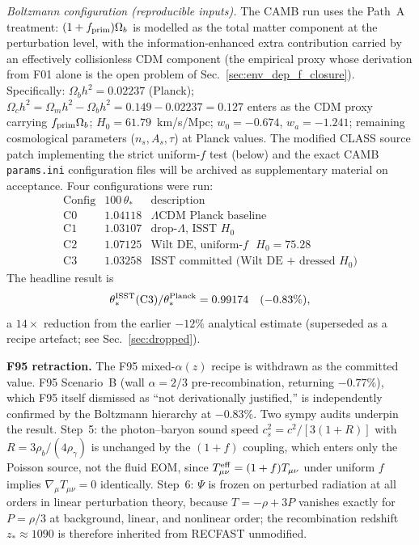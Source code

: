 \documentclass[aps,prd,twocolumn,nofootinbib,floatfix,superscriptaddress]{revtex4-2}
\newcommand{\fprim}{f_{\rm prim}}
\begin{document}
\emph{Boltzmann configuration (reproducible inputs).} The CAMB run
uses the Path~A treatment: $(1+\fprim)\Omega_b$ is modelled as the
total matter component at the perturbation level, with the
information-enhanced extra contribution carried by an effectively
collisionless CDM component (the empirical proxy whose derivation
from F01 alone is the open problem of
Sec.~\ref{sec:env_dep_f_closure}). Specifically: $\Omega_b h^2
= 0.02237$ (Planck); $\Omega_c h^2 = \Omega_m h^2 - \Omega_b h^2
= 0.149 - 0.02237 = 0.127$ enters as the CDM proxy carrying
$\fprim\Omega_b$; $H_0 = 61.79$~km/s/Mpc; $w_0 = -0.674$,
$w_a = -1.241$; remaining cosmological parameters
($n_s, A_s, \tau$) at Planck values. The modified CLASS source
patch implementing the strict uniform-$f$ test (below) and the
exact CAMB \texttt{params.ini} configuration files will be
archived as supplementary material on acceptance. Four
configurations were run:
\begin{equation*}
\begin{array}{lcl}
\textrm{Config} & 100\,\theta_* & \textrm{description} \\
\hline
\textrm{C0} & 1.04118 & \textrm{$\Lambda$CDM Planck baseline} \\
\textrm{C1} & 1.03107 & \textrm{drop-$\Lambda$, ISST $H_0$} \\
\textrm{C2} & 1.07125 & \textrm{Wilt DE, uniform-$f$ $H_0=75.28$} \\
\textrm{C3} & 1.03258 & \textrm{ISST committed (Wilt DE + dressed $H_0$)}
\end{array}
\end{equation*}
The headline result is
\begin{equation}
\theta_*^{\rm ISST}({\rm C3})/\theta_*^{\rm Planck} = 0.99174
\quad (-0.83\%),
\end{equation}
a $14\times$ reduction from the earlier $-12\%$ analytical estimate
(superseded as a recipe artefact; see Sec.~\ref{sec:dropped}).

\textbf{F95 retraction.} The F95 mixed-$\alpha(z)$ recipe is
withdrawn as the committed value. F95 Scenario~B (wall $\alpha=2/3$
pre-recombination, returning $-0.77\%$), which F95 itself dismissed
as ``not derivationally justified,'' is independently confirmed by
the Boltzmann hierarchy at $-0.83\%$. Two sympy audits underpin the
result. Step~5: the photon--baryon sound speed
$c_s^2 = c^2/[3(1+R)]$ with $R = 3\rho_b/(4\rho_\gamma)$ is unchanged
by the $(1+f)$ coupling, which enters only the Poisson source, not
the fluid EOM, since $T^{\rm eff}_{\mu\nu} = (1+f)T_{\mu\nu}$ under
uniform $f$ implies $\nabla_\mu T_{\mu\nu}=0$ identically. Step~6:
$\Psi$ is frozen on perturbed radiation at all orders in linear
perturbation theory, because $T = -\rho + 3P$ vanishes exactly for
$P = \rho/3$ at background, linear, and nonlinear order; the
recombination redshift $z_* \approx 1090$ is therefore inherited
from RECFAST unmodified.
\end{document}

